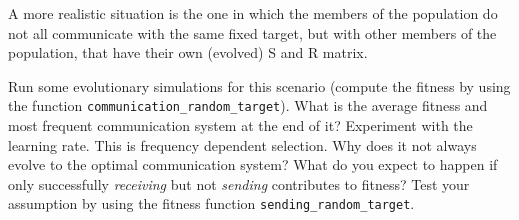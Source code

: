 \documentclass[a4paper, 9pt]{article}
\begin{document}
A more realistic situation is the one in which the members of the
population do not all communicate with the same fixed target, but with
other members of the population, that have their own (evolved) S and R
matrix.

\begin{exercise}
\action Run some evolutionary simulations for this scenario (compute the fitness by using the function \texttt{communication\_random\_target}). What is the average fitness and most frequent communication system at the end of it? Experiment with the learning rate.
\askstar This is frequency dependent selection. Why does it not always evolve to the optimal communication system?
\askstar What do you expect to happen if only successfully \textit{receiving} but not \textit{sending} contributes to fitness?
\action Test your assumption by using the fitness function \texttt{sending\_random\_target}. 
\end{exercise}

\printbibliography
\end{document}
